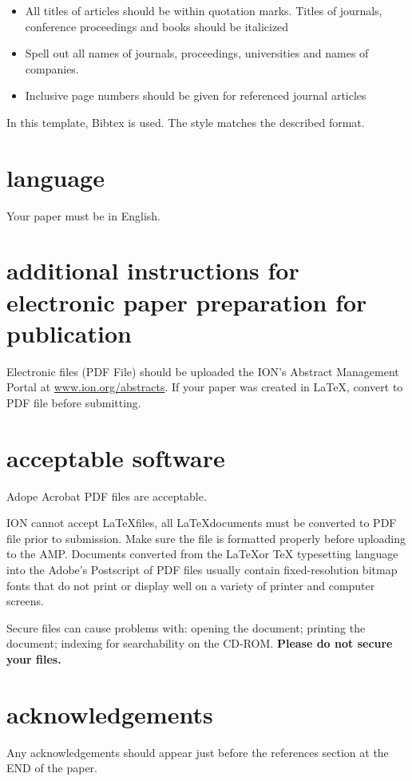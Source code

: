 \documentclass[letterpaper,times]{IONconf}
\begin{document}
\begin{itemize}
    \item All titles of articles should be within quotation marks. Titles of journals, conference proceedings and books should be italicized
    \item Spell out all names of journals, proceedings, universities and names of companies.
    \item Inclusive page numbers should be given for referenced journal articles
\end{itemize}

In this template, Bibtex is used. The style \verb|| matches the described format.


\section{language}

Your paper must be in English.

\section{additional instructions for electronic paper preparation for publication}

Electronic files (PDF File) should be uploaded the ION’s Abstract Management Portal at \url{www.ion.org/abstracts}. If your paper was created in \LaTeX, convert to PDF file before submitting.


\section{acceptable software}

Adope Acrobat PDF files are acceptable.

ION cannot accept \LaTeX files, all \LaTeX documents must be converted to PDF file prior to submission. Make sure the file is formatted properly before uploading to the AMP.  Documents converted from the \LaTeX or TeX typesetting language into the Adobe’s Postscript of PDF files usually contain fixed-resolution bitmap fonts that do not print or display well on a variety of printer and computer screens.  

Secure files can cause problems with: opening the document; printing the document; indexing for searchability on the CD-ROM. \textbf{\large{Please do not secure your files.}}


\section*{acknowledgements}

Any acknowledgements should appear just before the references section at the END of the paper.



\end{document}
